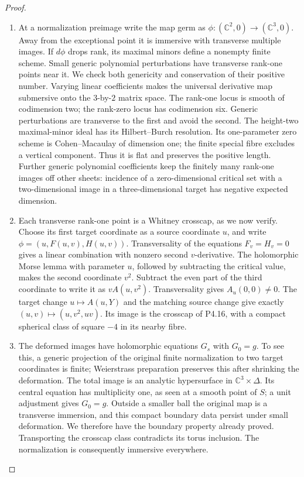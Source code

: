 \begin{proof}
\begin{enumerate}[label={$\langle1\rangle$\arabic*.},leftmargin=*]
\item At a normalization preimage write the map germ as
$\phi:(\mathbb C^2,0)\to(\mathbb C^3,0)$. Away from the
exceptional point it is immersive with transverse multiple
images. If $d\phi$ drops rank, its maximal minors define a
nonempty finite scheme. Small generic polynomial
perturbations have transverse rank-one points near it.
We check both genericity and conservation of their positive
number. Varying linear coefficients makes the universal
derivative map submersive onto the $3$-by-$2$ matrix space.
The rank-one locus is smooth of codimension two; the rank-zero
locus has codimension six. Generic perturbations are transverse
to the first and avoid the second. The height-two maximal-minor
ideal has its Hilbert--Burch resolution. Its one-parameter
zero scheme is Cohen--Macaulay of dimension one; the finite
special fibre excludes a vertical component. Thus it is flat
and preserves the positive length. Further generic polynomial
coefficients keep the finitely many rank-one images off other
sheets: incidence of a zero-dimensional critical set with a
two-dimensional image in a three-dimensional target has
negative expected dimension.

\item Each transverse rank-one point is a Whitney crosscap, as we
now verify. Choose its first target coordinate as a source
coordinate $u$, and write $\phi=(u,F(u,v),H(u,v))$.
Transversality of the equations $F_v=H_v=0$ gives a linear
combination with nonzero second $v$-derivative. The
holomorphic Morse lemma with parameter $u$, followed by
subtracting the critical value, makes the second coordinate
$v^2$. Subtract the even part of the third coordinate to
write it as $vA(u,v^2)$. Transversality gives $A_u(0,0)\ne0$.
The target change $u\mapsto A(u,Y)$ and the matching source
change give exactly $(u,v)\mapsto(u,v^2,uv)$.
Its image is the crosscap of P4.16, with a compact spherical
class of square $-4$ in its nearby fibre.

\item The deformed images have holomorphic equations $G_s$ with
$G_0=g$. To see this, a generic projection of the original
finite normalization to two target coordinates is finite;
Weierstrass preparation preserves this after shrinking the
deformation. The total image is an analytic hypersurface
in $\mathbb C^3\times\Delta$. Its central equation has
multiplicity one, as seen at a smooth point of $S$; a unit
adjustment gives $G_0=g$. Outside a smaller ball the original
map is a transverse immersion, and this compact boundary
data persist under small deformation. We therefore have
the boundary property already proved. Transporting the
crosscap class contradicts its torus inclusion. The
normalization is consequently immersive everywhere.


\end{enumerate}
\end{proof}

